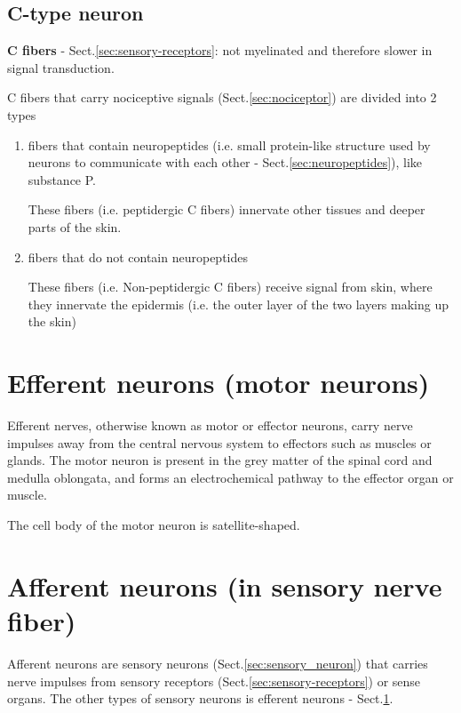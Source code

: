\subsection{C-type neuron}
\label{sec:C-type-sensory-neuron}

{\bf C fibers} - Sect.\ref{sec:sensory-receptors}: not myelinated and
therefore slower in signal transduction.
    
C fibers that carry nociceptive signals (Sect.\ref{sec:nociceptor}) are
divided into 2 types
    \begin{enumerate}
      \item  fibers that contain neuropeptides (i.e. small protein-like
      structure used by neurons to communicate with each other -
      Sect.\ref{sec:neuropeptides}), like substance P.
      
      These fibers (i.e.  peptidergic C fibers)  innervate other tissues and
      deeper parts of the skin. 
      
      \item  fibers that do not contain neuropeptides
      
      These fibers (i.e.  Non-peptidergic C fibers) receive signal from skin,
      where they innervate the epidermis (i.e. the outer layer of the two layers making up the skin)
    \end{enumerate}

\section{Efferent neurons (motor neurons)}
\label{sec:efferent_neurons}

Efferent nerves, otherwise known as motor or effector neurons, carry nerve
impulses away from the central nervous system to effectors such as muscles or
glands. The motor neuron is present in the grey matter of the spinal cord and medulla
oblongata, and forms an electrochemical pathway to the effector organ or muscle.


The cell body of the motor neuron is satellite-shaped.

\section{Afferent neurons (in sensory nerve fiber)}
\label{sec:afferent_neurons}

Afferent neurons are sensory neurons (Sect.\ref{sec:sensory_neuron}) that
carries nerve impulses from sensory receptors
(Sect.\ref{sec:sensory-receptors}) or sense organs. The other types of sensory
neurons is efferent neurons - Sect.\ref{sec:efferent_neurons}.

